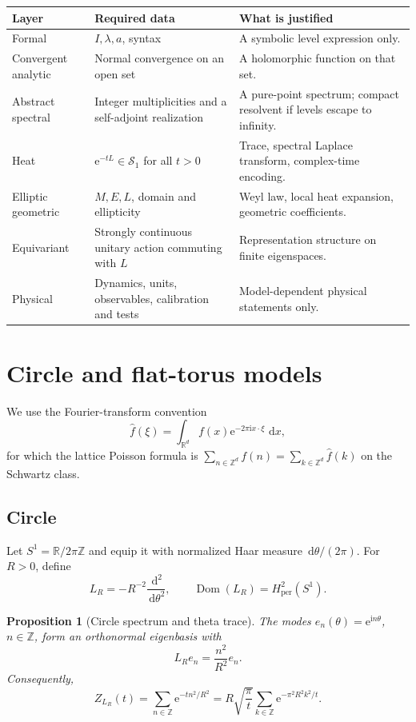 \documentclass[11pt,a4paper]{article}
\newtheorem{proposition}[theorem]{Proposition}
\theoremstyle{definition}
\theoremstyle{remark}
\newcommand{\R}{\mathbb R}
\newcommand{\Z}{\mathbb Z}
\newcommand{\Scal}{\mathcal S}
\newcommand{\Dom}{\operatorname{Dom}}
\newcommand{\e}{\mathrm e}
\newcommand{\ii}{\mathrm i}
\newcommand{\dd}{\,\mathrm d}
\begin{document}
\begin{center}
\small
\begin{tabularx}{\textwidth}{@{}>{\raggedright\arraybackslash}p{}
>{\raggedright\arraybackslash}p{}
>{\raggedright\arraybackslash}X@{}}
\toprule
Layer & Required data & What is justified \\
\midrule
Formal
& \(I,\lambda,a\), syntax
& A symbolic level expression only. \\
Convergent analytic
& Normal convergence on an open set
& A holomorphic function on that set. \\
Abstract spectral
& Integer multiplicities and a self-adjoint realization
& A pure-point spectrum; compact resolvent if levels escape to infinity. \\
Heat
& \(\e^{-tL}\in\Scal_1\) for all \(t>0\)
& Trace, spectral Laplace transform, complex-time encoding. \\
Elliptic geometric
& \(M,E,L\), domain and ellipticity
& Weyl law, local heat expansion, geometric coefficients. \\
Equivariant
& Strongly continuous unitary action commuting with \(L\)
& Representation structure on finite eigenspaces. \\
Physical
& Dynamics, units, observables, calibration and tests
& Model-dependent physical statements only. \\
\bottomrule
\end{tabularx}
\end{center}

\section{Circle and flat-torus models}

We use the Fourier-transform convention
\[
 \widehat f(\xi)=\int_{\R^d}f(x)\e^{-2\pi\ii x\cdot\xi}\,\dd x,
\]
for which the lattice Poisson formula is
\(\sum_{n\in\Z^d}f(n)=\sum_{k\in\Z^d}\widehat f(k)\) on the Schwartz class.

\subsection{Circle}

Let \(S^1=\R/2\pi\Z\) and equip it with normalized Haar measure
\(\dd\theta/(2\pi)\). For \(R>0\), define
\[
  L_R=-R^{-2}\frac{\dd^2}{\dd\theta^2},
  \qquad \Dom(L_R)=H^2_{\mathrm{per}}(S^1).
\]

\begin{proposition}[Circle spectrum and theta trace]
The modes \(e_n(\theta)=\e^{\ii n\theta}\), \(n\in\Z\), form an orthonormal
eigenbasis with
\[
  L_Re_n=\frac{n^2}{R^2}e_n.
\]
Consequently,
\[
  Z_{L_R}(t)=\sum_{n\in\Z}\e^{-tn^2/R^2}
  =
  R\sqrt{\frac{\pi}{t}}
  \sum_{k\in\Z}\e^{-\pi^2R^2k^2/t}.
\]
\end{proposition}
\end{document}
